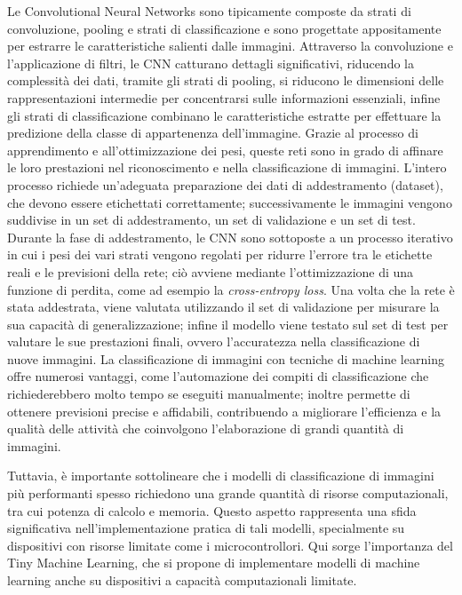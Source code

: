 Le Convolutional Neural Networks sono tipicamente composte da strati di convoluzione, pooling e strati di classificazione e sono progettate appositamente per estrarre le caratteristiche salienti dalle immagini. Attraverso la convoluzione e l'applicazione di filtri, le CNN catturano dettagli significativi, riducendo la complessità dei dati, tramite gli strati di pooling, si riducono le dimensioni delle rappresentazioni intermedie  per concentrarsi sulle informazioni essenziali, infine gli strati di classificazione combinano le caratteristiche estratte per effettuare la predizione della classe di appartenenza dell'immagine. Grazie al processo di apprendimento e all'ottimizzazione dei pesi, queste reti sono in grado di affinare le loro prestazioni nel riconoscimento e nella classificazione di immagini.
L'intero processo richiede un'adeguata preparazione dei dati di addestramento (dataset), che devono essere etichettati correttamente; successivamente le immagini vengono suddivise in un set di addestramento, un set di validazione e un set di test. Durante la fase di addestramento, le CNN sono sottoposte a un processo iterativo in cui i pesi dei vari strati vengono regolati per ridurre l'errore tra le etichette reali e le previsioni della rete; ciò avviene mediante l'ottimizzazione di una funzione di perdita, come ad esempio la \textit{cross-entropy loss}.
%
Una volta che la rete è stata addestrata, viene valutata utilizzando il set di validazione per misurare la sua capacità di generalizzazione; infine il modello viene testato sul set di test per valutare le sue prestazioni finali, ovvero l'accuratezza nella classificazione di nuove immagini.
%
La classificazione di immagini con tecniche di machine learning offre numerosi vantaggi, come l'automazione dei compiti di classificazione che richiederebbero molto tempo se eseguiti manualmente; inoltre permette di ottenere previsioni precise e affidabili, contribuendo a migliorare l'efficienza e la qualità delle attività che coinvolgono l'elaborazione di grandi quantità di immagini.

Tuttavia, è importante sottolineare che i modelli di classificazione di immagini più performanti spesso richiedono una grande quantità di risorse computazionali, tra cui potenza di calcolo e memoria. Questo aspetto rappresenta una sfida significativa nell'implementazione pratica di tali modelli, specialmente su dispositivi con risorse limitate come i microcontrollori.
Qui sorge l'importanza del Tiny Machine Learning, che si propone di implementare modelli di machine learning anche su dispositivi a capacità computazionali limitate.

